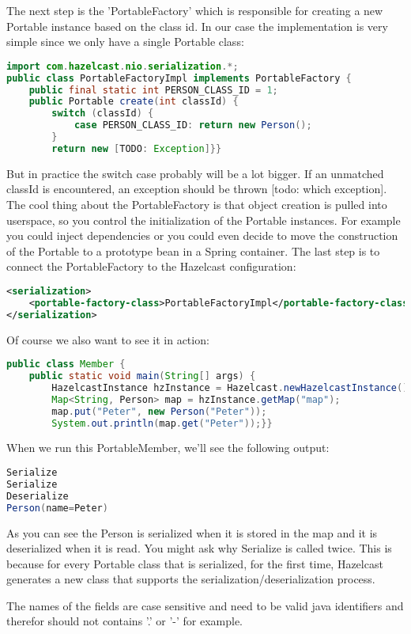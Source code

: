 The next step is the 'PortableFactory' which is responsible for creating a new Portable instance based on the class id. In our case the implementation is very simple since we only have a single Portable class:
\begin{lstlisting}[language=java]
import com.hazelcast.nio.serialization.*;
public class PortableFactoryImpl implements PortableFactory {
    public final static int PERSON_CLASS_ID = 1;
    public Portable create(int classId) {
        switch (classId) {
            case PERSON_CLASS_ID: return new Person();
        }
        return new [TODO: Exception]}}
\end{lstlisting}
But in practice the switch case probably will be a lot bigger. If an unmatched classId is encountered, an exception should be thrown [todo: which exception]. The cool thing about the PortableFactory is that object creation is pulled into userspace, so you control the initialization of the Portable instances. For example you could inject dependencies or you could even decide to move the construction of the Portable to a prototype bean in a Spring container. The last step is to connect the PortableFactory to the Hazelcast configuration:
\begin{lstlisting}[language=xml]
<serialization>
    <portable-factory-class>PortableFactoryImpl</portable-factory-class>
</serialization>
\end{lstlisting}
Of course we also want to see it in action:
\begin{lstlisting}[language=java]
public class Member {
    public static void main(String[] args) {
        HazelcastInstance hzInstance = Hazelcast.newHazelcastInstance();
        Map<String, Person> map = hzInstance.getMap("map");
        map.put("Peter", new Person("Peter"));
        System.out.println(map.get("Peter"));}}
\end{lstlisting}
When we run this PortableMember, we'll see the following output:
\begin{lstlisting}[language=java]
Serialize
Serialize
Deserialize
Person(name=Peter)
\end{lstlisting}
As you can see the Person is serialized when it is stored in the map and it is deserialized when it is read. You might ask why Serialize is called twice. This is because for every Portable class that is serialized, for the first time, Hazelcast generates a new class that supports the serialization/deserialization process. 

The names of the fields are case sensitive and need to be valid java identifiers and therefor should not contains '.' or '-' for example. 

